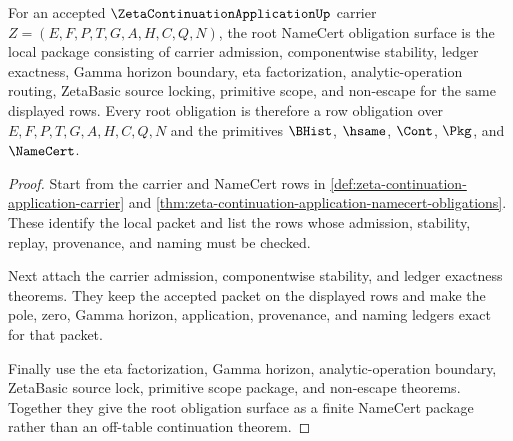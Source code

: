 \begin{theorem}
\label{thm:zeta-continuation-application-root-namecert-obligation-surface}
For an accepted $\ZetaContinuationApplicationUp$ carrier $Z=(E,F,P,T,G,A,H,C,Q,N)$, the root NameCert obligation surface is the local package consisting of carrier admission, componentwise stability, ledger exactness, Gamma horizon boundary, eta factorization, analytic-operation routing, ZetaBasic source locking, primitive scope, and non-escape for the same displayed rows. Every root obligation is therefore a row obligation over $E,F,P,T,G,A,H,C,Q,N$ and the primitives $\BHist$, $\hsame$, $\Cont$, $\Pkg$, and $\NameCert$.
\end{theorem}
\begin{proof}
Start from the carrier and NameCert rows in \autoref{def:zeta-continuation-application-carrier} and \autoref{thm:zeta-continuation-application-namecert-obligations}. These identify the local packet and list the rows whose admission, stability, replay, provenance, and naming must be checked.

Next attach the carrier admission, componentwise stability, and ledger exactness theorems. They keep the accepted packet on the displayed rows and make the pole, zero, Gamma horizon, application, provenance, and naming ledgers exact for that packet.

Finally use the eta factorization, Gamma horizon, analytic-operation boundary, ZetaBasic source lock, primitive scope package, and non-escape theorems. Together they give the root obligation surface as a finite NameCert package rather than an off-table continuation theorem.
\end{proof}

